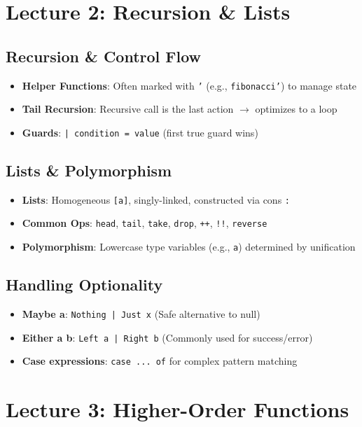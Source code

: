 \documentclass[11pt,twoside=off,openright,numbers=noenddot]{scrbook}
\begin{document}
\chapter{Lecture 2: Recursion \& Lists}
\label{sec:org12df93a}
\section{Recursion \& Control Flow}
\label{sec:orga5f6e25}
\begin{itemize}
\item \textbf{Helper Functions}: Often marked with \texttt{'} (e.g., \texttt{fibonacci'}) to manage state
\item \textbf{Tail Recursion}: Recursive call is the last action \(\rightarrow\) optimizes to a loop
\item \textbf{Guards}: \texttt{| condition = value} (first true guard wins)
\end{itemize}
\section{Lists \& Polymorphism}
\label{sec:org28ca8fe}
\begin{itemize}
\item \textbf{Lists}: Homogeneous \texttt{[a]}, singly-linked, constructed via cons \texttt{:}
\item \textbf{Common Ops}: \texttt{head}, \texttt{tail}, \texttt{take}, \texttt{drop}, \texttt{++}, \texttt{!!}, \texttt{reverse}
\item \textbf{Polymorphism}: Lowercase type variables (e.g., \texttt{a}) determined by unification
\end{itemize}
\section{Handling Optionality}
\label{sec:org2ab370f}
\begin{itemize}
\item \textbf{Maybe a}: \texttt{Nothing | Just x} (Safe alternative to null)
\item \textbf{Either a b}: \texttt{Left a | Right b} (Commonly used for success/error)
\item \textbf{Case expressions}: \texttt{case ... of} for complex pattern matching
\end{itemize}
\chapter{Lecture 3: Higher-Order Functions}
\label{sec:org0154a36}
\end{document}
